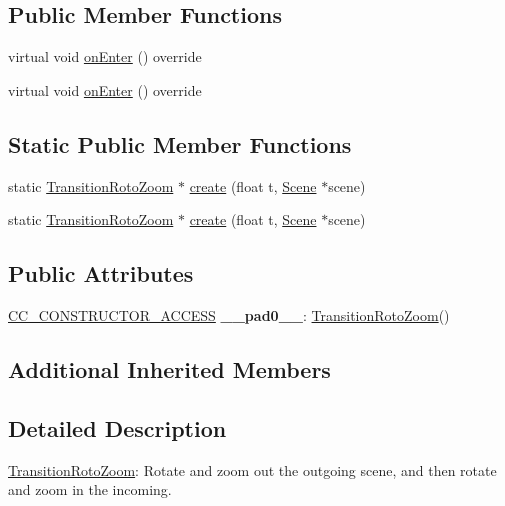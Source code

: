 \subsection*{Public Member Functions}
\begin{DoxyCompactItemize}
\item 
virtual void \hyperlink{classTransitionRotoZoom_a087ead50631d8e2fdf62f7fd6c265caa}{on\+Enter} () override
\item 
virtual void \hyperlink{classTransitionRotoZoom_ac996aa76e096939509fda8a3468fc113}{on\+Enter} () override
\end{DoxyCompactItemize}
\subsection*{Static Public Member Functions}
\begin{DoxyCompactItemize}
\item 
static \hyperlink{classTransitionRotoZoom}{Transition\+Roto\+Zoom} $\ast$ \hyperlink{classTransitionRotoZoom_aae9f3b847a7144b77cab7525bfee40a8}{create} (float t, \hyperlink{classScene}{Scene} $\ast$scene)
\item 
static \hyperlink{classTransitionRotoZoom}{Transition\+Roto\+Zoom} $\ast$ \hyperlink{classTransitionRotoZoom_ab8a03c28078d4d5723d3f1eb1f43ecfb}{create} (float t, \hyperlink{classScene}{Scene} $\ast$scene)
\end{DoxyCompactItemize}
\subsection*{Public Attributes}
\begin{DoxyCompactItemize}
\item 
\mbox{\label{classTransitionRotoZoom_a3e87c6e57d97a79876b0cdfb1a39b7be}} 
\hyperlink{_2cocos2d_2cocos_2base_2ccConfig_8h_a25ef1314f97c35a2ed3d029b0ead6da0}{C\+C\+\_\+\+C\+O\+N\+S\+T\+R\+U\+C\+T\+O\+R\+\_\+\+A\+C\+C\+E\+SS} {\bfseries \+\_\+\+\_\+pad0\+\_\+\+\_\+}\+: \hyperlink{classTransitionRotoZoom}{Transition\+Roto\+Zoom}()
\end{DoxyCompactItemize}
\subsection*{Additional Inherited Members}


\subsection{Detailed Description}
\hyperlink{classTransitionRotoZoom}{Transition\+Roto\+Zoom}\+: Rotate and zoom out the outgoing scene, and then rotate and zoom in the incoming. 

